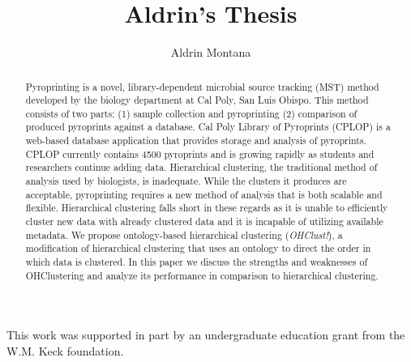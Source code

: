 \documentclass[12pt]{ucthesis}
\begin{document}
\title{Aldrin's Thesis}
\author{Aldrin Montana}



\maketitle
\begin{frontmatter}
   \copyrightpage

   \committeemembershippage

   \begin{abstract}
      Pyroprinting is a novel, library-dependent microbial source
      tracking (MST) method developed by the biology department at Cal Poly,
      San Luis Obispo. This method consists of two parts: (1) sample collection
      and pyroprinting (2) comparison of produced pyroprints against a
      database.  Cal Poly Library of Pyroprints (CPLOP) is a web-based database
      application that provides storage and analysis of pyroprints. CPLOP
      currently contains 4500 pyroprints and is growing rapidly as students and
      researchers continue adding data. Hierarchical clustering, the
      traditional method of analysis used by biologists, is inadequate. While
      the clusters it produces are acceptable, pyroprinting requires a new
      method of analysis that is both scalable and flexible. Hierarchical
      clustering falls short in these regards as it is unable to efficiently
      cluster new data with already clustered data and it is incapable of
      utilizing available metadata. We propose ontology-based hierarchical
      clustering (\textit{OHClust!}), a modification of hierarchical clustering
      that uses an ontology to direct the order in which data is clustered. In
      this paper we discuss the strengths and weaknesses of OHClustering and
      analyze its performance in comparison to hierarchical clustering.
   \end{abstract}

   \begin{acknowledgements}
      This work was supported in part by an undergraduate education grant from
      the W.M. Keck foundation.
   \end{acknowledgements}

   \tableofcontents

   \listoftables
   \listoffigures
\end{frontmatter}
\end{document}
